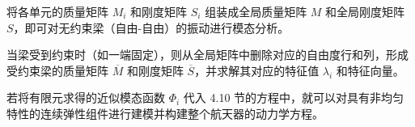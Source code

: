 将各单元的质量矩阵 \(M_i\) 和刚度矩阵 \(S_i\) 组装成全局质量矩阵 \(M\) 和全局刚度矩阵 \(S\)，即可对无约束梁（自由-自由）的振动进行模态分析。

当梁受到约束时（如一端固定），则从全局矩阵中删除对应的自由度行和列，形成受约束梁的质量矩阵 \(\overline{M}\) 和刚度矩阵 \(\overline{S}\)，并求解其对应的特征值 \(\lambda_i\) 和特征向量。

若将有限元求得的近似模态函数 \(\Phi_i\) 代入 4.10 节的方程中，就可以对具有非均匀特性的连续弹性组件进行建模并构建整个航天器的动力学方程。